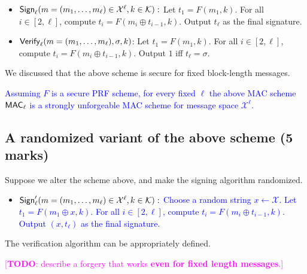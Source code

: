 \documentclass[10pt,addpoints]{exam}
\newcommand{\calK}{\mathcal{K}}
\newcommand{\calX}{\mathcal{X}}
\newcommand{\TODO}[1]{\textcolor{magenta}{[\textbf{TODO}: #1]}}
\newenvironment{customthm}[1]
  {\renewcommand\theinnercustomthm{\textcolor{blue}{#1}}\innercustomthm}
  {\endinnercustomthm}
\theoremstyle{definition}
\begin{document}
    \begin{itemize}
        \item {$\signell(m = (m_1, \ldots, m_{\ell}) \in \calX^{\ell}, k \in \calK):$ Let $t_1 = F(m_1, k)$. For all $i\in [2,\ell]$, compute $t_i = F(m_i \oplus t_{i-1}, k)$. Output $t_{\ell}$ as the final signature. }

        \item {$\mathsf{Verify}_{\ell}(m = (m_1, \ldots, m_{\ell}), \sigma, k)$: Let $t_1 = F(m_1, k)$. For all $i\in [2,\ell]$, compute $t_i = F(m_i \oplus t_{i-1}, k)$. Output $1$ iff $t_{\ell} = \sigma$.}
    \end{itemize}


    We discussed that the above scheme is secure for fixed block-length messages. 

    \begin{customthm}{A3.01}
        \textcolor{blue}{Assuming $F$ is a secure PRF scheme, for every fixed $\ell$ the above MAC scheme $\mathsf{MAC}_{\ell}$ is a strongly unforgeable MAC scheme for message space $\calX^{\ell}$.}
    \end{customthm}

    \vspace{10pt}

    \subsection{A randomized variant of the above scheme (5 marks)} 

        Suppose we alter the scheme above, and make the signing algorithm randomized. 

        \begin{itemize}

            \item \textcolor{blue}{$\signell'(m = (m_1, \ldots, m_{\ell}) \in \calX^{\ell}, k \in \calK):$ Choose a random string $x\gets \calX$. Let $t_1 = F(m_1 \oplus x, k)$. For all $i\in [2,\ell]$, compute $t_i = F(m_i \oplus t_{i-1}, k)$. Output $(x, t_{\ell})$ as the final signature.}

        \end{itemize}

        The verification algorithm can be appropriately defined. 

        \vspace{10pt}

        \TODO{describe a forgery that works \textbf{even for fixed length messages}.}

        \color{black}
\end{document}
